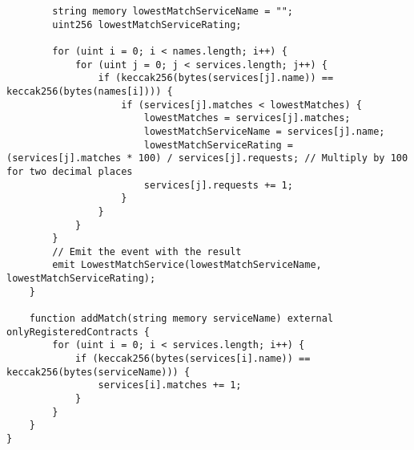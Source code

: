 \begin{lstlisting}
        string memory lowestMatchServiceName = "";
        uint256 lowestMatchServiceRating;

        for (uint i = 0; i < names.length; i++) {
            for (uint j = 0; j < services.length; j++) {
                if (keccak256(bytes(services[j].name)) == keccak256(bytes(names[i]))) {
                    if (services[j].matches < lowestMatches) {
                        lowestMatches = services[j].matches;
                        lowestMatchServiceName = services[j].name;
                        lowestMatchServiceRating = (services[j].matches * 100) / services[j].requests; // Multiply by 100 for two decimal places
                        services[j].requests += 1;
                    }
                }
            }
        }
        // Emit the event with the result
        emit LowestMatchService(lowestMatchServiceName, lowestMatchServiceRating);
    }

    function addMatch(string memory serviceName) external onlyRegisteredContracts {
        for (uint i = 0; i < services.length; i++) {
            if (keccak256(bytes(services[i].name)) == keccak256(bytes(serviceName))) {
                services[i].matches += 1;
            }
        }
    }
}
\end{lstlisting}


\lstset{
  basicstyle=\footnotesize\ttfamily,
  breaklines=true,
  numbers=left,
  firstnumber=1,
}


